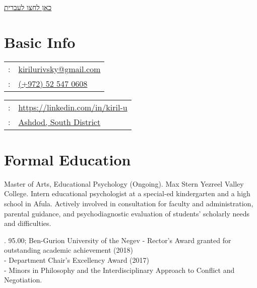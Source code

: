 \maketitle
\begin{minipage}[t]{0\textwidth}
{\footnotesize\hfill{}\color{gray}
%	
\hfill{}\hyperref[sec:basicinfoheb]{כאן לחצו לעברית} %
}
\end{minipage}
\setLTR
\section{Basic Info}
\label{sec:basicinfoeng}
\begin{minipage}[t]{.5\linewidth}
\begin{tabular}{rp{.75\linewidth}}
\baselineskip=20pt
\email{} :   & \href{mailto:kirilurivsky@gmail.com}{kirilurivsky@gmail.com}\\
\phone{} : &\href{tel:972525470608}{(+972) 52 547 0608} \\
\end{tabular}
\end{minipage}
\begin{minipage}[t]{.5\linewidth}
\begin{tabular}{rl}
\linkedin{} : &\href{https://www.linkedin.com/in/kiril-u}{https://linkedin.com/in/kiril-u}\\
\location{} : &\href{https://goo.gl/maps/MSacjpSy7vZSKykP7}{Ashdod, South District}                  
\end{tabular}
\end{minipage}
%
%
\section{Formal Education} %
 
{Master of Arts, Educational Psychology (Ongoing). Max Stern Yezreel Valley College.}
{Intern educational psychologist at a special-ed kindergarten and a high school in Afula. Actively involved in consultation for faculty and administration, parental guidance, and psychodiagnostic evaluation of students' scholarly needs and difficulties.}
{}

{\BA. 95.00; Ben-Gurion University of the Negev}
{- Rector's Award granted for outstanding academic achievement (2018) \\
- Department Chair’s Excellency Award (2017) \\
- Minors in Philosophy and the Interdisciplinary Approach to Conflict and Negotiation.}
{}

